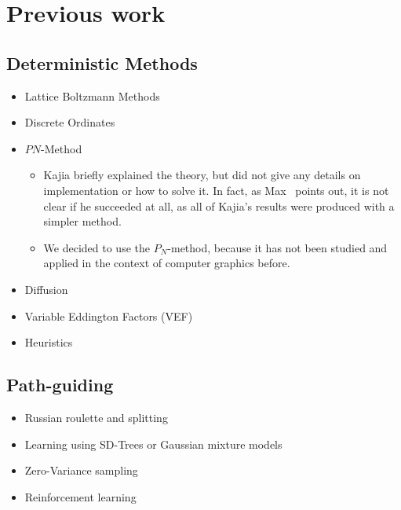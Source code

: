 



\section{Previous work}

\subsection*{Deterministic Methods}

\begin{itemize}
  \item Lattice Boltzmann Methods \cite{Geist04}
  \item Discrete Ordinates \cite{Languenou95}
  \item $PN$-Method \cite{Kajiya84} 
    \begin{itemize}
        \item Kajia briefly explained the theory, but did not give any details on implementation or how to solve it. In fact, as Max~\cite{Max95} points out, it is not clear if he succeeded at all, as all of Kajia's results were produced with a simpler method. 
        \item We decided to use the $P_N$-method, because it has not been studied and applied in the context of computer graphics before.
    \end{itemize}
  \item Diffusion \cite{Stam95} \cite{Jakob10}
  \item Variable Eddington Factors (VEF) \cite{Koerner14}
  \item Heuristics \cite{Kaplanyan10} \cite{Elek14}
\end{itemize}

\subsection*{Path-guiding}

\begin{itemize}
  \item Russian roulette and splitting \cite{Vorba16}
  \item Learning using SD-Trees \cite{Pegoraro08} \cite{Mueller17} or Gaussian mixture models \cite{Vorba14}
  \item Zero-Variance sampling \cite{Krivanek14}
  \item Reinforcement learning \cite{Dahm17}
\end{itemize}




